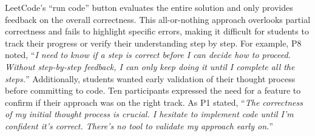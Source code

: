 LeetCode's ``run code'' button evaluates the entire solution and only provides feedback on the overall correctness. This all-or-nothing approach overlooks partial correctness and fails to highlight specific errors, making it difficult for students to track their progress or verify their understanding step by step. For example, P8 noted, ``\emph{I need to know if a step is correct before I can decide how to proceed. Without step-by-step feedback, I can only keep doing it until I complete all the steps.}'' Additionally, students wanted early validation of their thought process before committing to code. Ten participants expressed the need for a feature to confirm if their approach was on the right track. As P1 stated, ``\emph{The correctness of my initial thought process is crucial. I hesitate to implement code until I'm confident it's correct. There's no tool to validate my approach early on.}''















